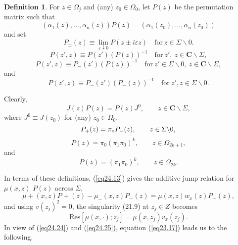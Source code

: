 \documentclass{surv-l}
\theoremstyle{plain}
\theoremstyle{definition}
\newtheorem{definition}[theorem]{Definition}
\numberwithin{equation}{chapter}
\begin{document}
\begin{definition}\label{defi24.15}
For $z\in\Omega_{j}$ and (any) $z_{0}\in\Omega_{0}$, let $P(z)$ be the permutation matrix such that
\begin{equation*}
(\alpha_{1}(z),\ldots,\alpha_{n}(z))P(z)=(\alpha_{1}(z_{0}),\ldots,\alpha_{n}(z_{0}))
\end{equation*}
and set 
\renewcommand{\theequation}{\thesection.\arabic{equation}}
\setcounter{equation}{15}
\begin{equation}\label{eq24.16}
P_{\pm}(z) \equiv\lim_{\varepsilon\downarrow 0}P(z\pm i\varepsilon z)\quad \mathrm{for}\ z\in\Sigma\backslash 0.
\end{equation}
\setcounter{equation}{16}
\begin{equation}\label{eq24.17}
P(z', z) \equiv P(z')(P(z))^{-1}\quad \mathrm{for}\ z',\  z\in \mathbf{C}\backslash \Sigma,
\end{equation}
\begin{equation}\label{eq24.18}
P(z', z) \equiv P_{-}(z')(P(z))^{-1}\quad \mathrm{for}\ z'\in\Sigma\backslash 0,\  z\in \mathbf{C}\backslash \Sigma,
\end{equation}
and
\begin{equation}\label{eq24.19}
P(z', z)\equiv P_{-}(z')(P_{-}(z))^{-1}\quad \mathrm{for}\ z', z\in\Sigma\backslash 0.
\end{equation}

Clearly,
\begin{equation}\label{eq24.20}
J(z)P(z)=P(z)J^{0},\qquad  z\in \mathbf{C}\backslash \Sigma,
\end{equation}
where $J^{0}\equiv J(z_{0})$ for (any) $z_{0}\in\Omega_{0}$,
\begin{equation}\label{eq24.21}
P_{+}(z)=\pi_{z}P_{-}(z),\qquad z\in\Sigma\backslash 0,\\
\end{equation}
\begin{equation}\label{eq24.22}
P(z)=\pi_{0}(\pi_{1}\pi_{0})^{k},\qquad z\in\Omega_{2k+1},
\end{equation}
and
\begin{equation}\label{eq24.23}
P(z)=(\pi_{1}\pi_{0})^{k},\qquad z\in\Omega_{2k}.
\end{equation}

In terms of these definitions, (\ref{eq24.13}) gives the additive jump relation for $\mu(x, z)$ $P(z)$ across $\Sigma$,
\begin{equation}\label{eq24.24}
\mu+(x, z)P+(z)-\mu_{-}(x, z)P_{-}(z)=\mu(x, z)w_{x}(z)P_{-}(z),
\end{equation}
and using $v(z_{j})^{2}=0$, the singularity (21.9) at $z_{j}\in Z$ becomes
\begin{equation}\label{eq24.25}
\mathrm{Res}[\mu(x, \cdot); z_{j}]=\mu(x, z_{j})v_{x}(z_{j}).
\end{equation}
In view of (\ref{eq24.24}) and (\ref{eq24.25}), equation (\ref{eq23.17}) leads us to the following.
\end{definition}
\end{document}
